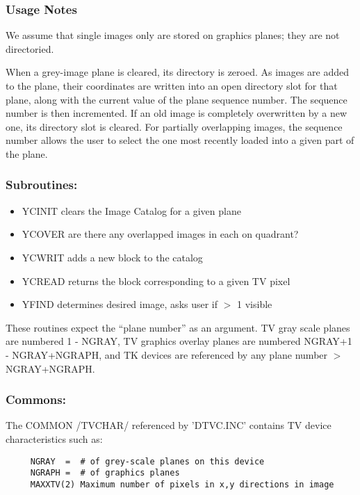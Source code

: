 \subsubsection{Usage Notes}


   We assume that single images only are stored on graphics planes;
they are not directoried.

   When a grey-image plane is cleared, its directory is zeroed.
As images are added to the plane, their coordinates are written
into an open directory slot for that plane, along with the current
value of the plane sequence number.  The sequence number is then
incremented.  If an old image is completely overwritten by a new
one, its directory slot is cleared.  For partially overlapping
images, the sequence number allows the user to select the one most
recently loaded into a given part of the plane.


\subsubsection{ Subroutines:}
\begin{itemize}

\item YCINIT  clears the Image Catalog for a given plane
\item YCOVER  are there any overlapped images in each on quadrant?
\item YCWRIT  adds a new block to the catalog
\item YCREAD  returns the block corresponding to a given TV pixel
\item YFIND   determines desired image, asks user if $>$ 1 visible
\end{itemize}
These routines expect the ``plane number'' as an argument.  TV gray scale
planes are numbered 1 - NGRAY, TV graphics overlay planes are numbered
NGRAY+1 - NGRAY+NGRAPH, and TK devices are referenced by any plane
number $>$ NGRAY+NGRAPH.


\subsubsection{ Commons:}

     The COMMON /TVCHAR/ referenced by 'DTVC.INC' contains TV device
characteristics such as:
\begin{verbatim}
     NGRAY  =  # of grey-scale planes on this device
     NGRAPH =  # of graphics planes
     MAXXTV(2) Maximum number of pixels in x,y directions in image
\end{verbatim}

